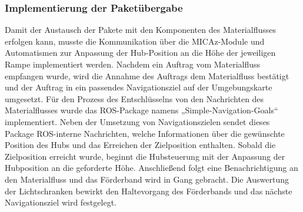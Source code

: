 \subsubsection{Implementierung der Paketübergabe}
Damit der Austausch der Pakete mit den Komponenten des Materialflusses erfolgen kann, musste die Kommunikation über die MICAz-Module und Automatismen zur Anpassung der Hub-Position an die Höhe der jeweiligen Rampe implementiert werden. Nachdem ein Auftrag vom Materialfluss empfangen wurde, wird die Annahme des Auftrags dem Materialfluss bestätigt und der Auftrag in ein passendes Navigationsziel auf der Umgebungskarte umgesetzt. Für den Prozess des Entschlüsselns von den Nachrichten des Materialflusses wurde das ROS-Package namens „Simple-Navigation-Goals“ implementiert. Neben der Umsetzung von Navigationszielen sendet dieses Package ROS-interne Nachrichten, welche Informationen über die gewünschte Position des Hubs und das Erreichen der Zielposition enthalten.
Sobald die Zielposition erreicht wurde, beginnt die Hubsteuerung mit der Anpassung der Hubposition an die geforderte Höhe. Anschließend folgt eine Benachrichtigung an den Materialfluss und das Förderband wird in Gang gebracht. Die Auswertung der Lichtschranken bewirkt den Haltevorgang des Förderbands und das nächste Navigationsziel wird festgelegt.


